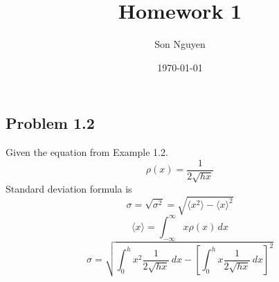 \documentclass{article}
\title{Homework 1}
\author{Son Nguyen}
\date{\today}
\begin{document}
\maketitle %
\doublespacing

\subsection*{Problem 1.2}
Given the equation from Example 1.2. \newline
\begin{equation}
    \rho(x) = \frac{1}{2{\sqrt{hx}}}
\end{equation}
Standard deviation formula is
\begin{equation}
    \sigma = \sqrt{\sigma^2} = \sqrt{\langle x^2 \rangle - {\langle x \rangle}^2}
\end{equation}
\begin{equation}
    \langle x \rangle = \int_{-\infty}^{\infty} x \rho(x) \, dx
\end{equation}
\begin{equation}
    \sigma = \sqrt{\int_{0}^{h} x^2 \frac{1}{2\sqrt{hx}} \, dx - \left[ \int_{0}^{h} x \frac{1}{2\sqrt{hx}} \, dx \right]^2}
\end{equation}
\end{document}
